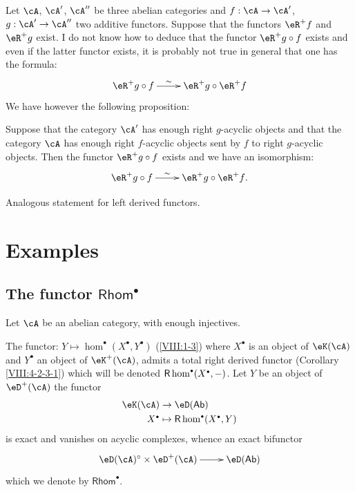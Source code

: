Let $\cA$, $\cA'$, $\cA''$ be three abelian categories and
$f:\cA\to \cA'$, $g:\cA'\to \cA''$ two additive functors. Suppose that the
functors $\eR^+ f$ and $\eR^+ g$ exist. I do not know how to deduce that the
functor $\eR^+ g\circ f$ exists and even if the latter functor exists, it
is probably not true in general that one has the formula:
\[\xymatrix{
  \eR^+ g\circ f\ar[r]^-\sim
    & \eR^+ g \circ \eR^+ f
}\]
We have however the following proposition: 





\begin{proposition}\label{VIII:4-3-1}
Suppose that the category $\cA'$ has enough
right $g$-acyclic objects and that the category $\cA$ has enough
right $f$-acyclic objects sent by $f$ to right
$g$-acyclic objects. Then the functor $\eR^+ g\circ f$ exists and we have an
isomorphism: 
\[\xymatrix{
  \eR^+ g\circ f \ar[r]^-\sim 
    & \eR^+ g \circ \eR^+ f \text{.}
}\]
\end{proposition}

Analogous statement for left derived functors. 















\section{Examples}\label{VIII:6} %










\subsection{The functor \texorpdfstring{$\mathsf{Rhom}^\bullet$}{Hom*}}\label{VIII:6-1}

Let $\cA$ be an abelian category, with enough injectives.

The functor: $Y\mapsto \hom^\bullet(X^\bullet,Y^\bullet)$ (\ref{VIII:1-3})
where $X^\bullet$ is an object of $\eK(\cA)$ and $Y^\bullet$ an object of
$\eK^+(\cA)$, admits a total right derived functor
(Corollary \ref{VIII:4-2-3-1}) which will be denoted $\rhom^\bullet(X^\bullet,-)$.
Let $Y$ be an object of $\eD^+(\cA)$ the functor 
\begin{align*}
  \eK(\cA) &\to \eD(\mathsf{Ab}) \\
  X^\bullet &\mapsto \rhom^\bullet(X^\bullet,Y) 
\end{align*}
is exact and vanishes on acyclic complexes, whence an exact
bifunctor
\[\xymatrix{
  \eD(\cA)^\circ \times \eD^+(\cA) \ar[r]
    & \eD(\mathsf{Ab})
}\]
which we denote by $\mathsf{Rhom}^\bullet$.

